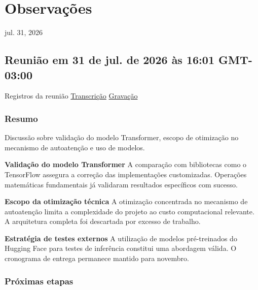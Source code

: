 

\chapter{\textbf{ Observações}}



jul. 31, 2026



\section{\textbf{Reunião em 31 de jul. de 2026 às 16:01 GMT-03:00}}



Registros da reunião \href{https://docs.google.com/document/d/1WBgwj1gDAWh_7VGckHvPhRfSlcRzFIwL2JlnIDhRYbQ/edit?usp=drive_web&tab=t.v1ze8hoqd423}{Transcrição} \href{https://drive.google.com/file/d/1-FFyxhkpgkhlesSqULSIaujRSiDnT1UN/view?usp=drive_web}{Gravação}



\subsection{\textbf{Resumo}}



Discussão sobre validação do modelo Transformer, escopo de otimização no mecanismo de autoatenção e uso de modelos.




\textbf{Validação do modelo Transformer} A comparação com bibliotecas como o TensorFlow assegura a correção das implementações customizadas. Operações matemáticas fundamentais já validaram resultados específicos com sucesso.




\textbf{Escopo da otimização técnica} A otimização concentrada no mecanismo de autoatenção limita a complexidade do projeto ao custo computacional relevante. A arquitetura completa foi descartada por excesso de trabalho.




\textbf{Estratégia de testes externos} A utilização de modelos pré-treinados do Hugging Face para testes de inferência constitui uma abordagem válida. O cronograma de entrega permanece mantido para novembro.



\subsection{\textbf{Próximas etapas}}


